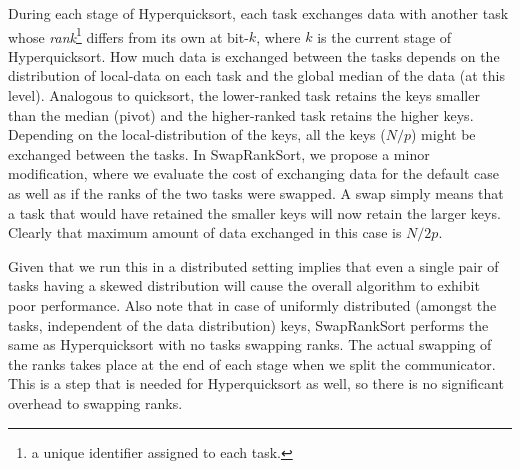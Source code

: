 During each stage of Hyperquicksort, each task exchanges data with another task whose {\em rank}\footnote{a unique identifier assigned to each task.} differs from its own at bit-$k$, where $k$ is the current stage of Hyperquicksort. How much data is exchanged between the tasks depends on the distribution of local-data on each task and the global median of the data (at this level). Analogous to quicksort, the lower-ranked task retains the keys smaller than the median (pivot) and the higher-ranked task retains the higher keys. Depending on the local-distribution of the keys, all the keys ($N/p$) might be exchanged between the tasks. In {\sc SwapRankSort}, we propose a minor modification, where we evaluate the cost of exchanging data for the default case as well as if the ranks of the two tasks were swapped. A swap simply means that a task that would have retained the smaller keys will now retain the larger keys. Clearly that maximum amount of data exchanged in this case is $N/2p$. 

Given that we run this in a distributed setting implies that even a single pair of tasks having a skewed distribution will cause the overall algorithm to exhibit poor performance. Also note that in case of uniformly distributed (amongst the tasks, independent of the data distribution) keys, {\sc SwapRankSort} performs the same as Hyperquicksort with no tasks swapping ranks. The actual swapping of the ranks takes place at the end of each stage when we split the communicator. This is a step that is needed for Hyperquicksort as well, so there is no significant overhead to swapping ranks. 

